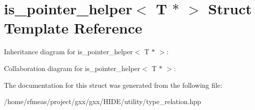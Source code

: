 \hypertarget{structis__pointer__helper_3_01T_01_5_01_4}{}\section{is\+\_\+pointer\+\_\+helper$<$ T $\ast$ $>$ Struct Template Reference}
\label{structis__pointer__helper_3_01T_01_5_01_4}


Inheritance diagram for is\+\_\+pointer\+\_\+helper$<$ T $\ast$ $>$\+:


Collaboration diagram for is\+\_\+pointer\+\_\+helper$<$ T $\ast$ $>$\+:


The documentation for this struct was generated from the following file\+:\begin{DoxyCompactItemize}
\item 
/home/rfmeas/project/gxx/gxx/\+H\+I\+D\+E/utility/type\+\_\+relation.\+hpp\end{DoxyCompactItemize}
